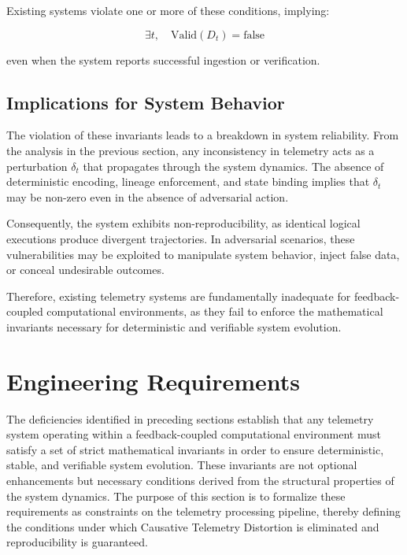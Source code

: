 Existing systems violate one or more of these conditions, implying:

\begin{equation}
\exists t, \quad \text{Valid}(D_t) = \text{false}
\end{equation}

even when the system reports successful ingestion or verification.

\subsection{Implications for System Behavior}

The violation of these invariants leads to a breakdown in system reliability. From the analysis in the previous section, any inconsistency in telemetry acts as a perturbation $\delta_t$ that propagates through the system dynamics. The absence of deterministic encoding, lineage enforcement, and state binding implies that $\delta_t$ may be non-zero even in the absence of adversarial action.

Consequently, the system exhibits non-reproducibility, as identical logical executions produce divergent trajectories. In adversarial scenarios, these vulnerabilities may be exploited to manipulate system behavior, inject false data, or conceal undesirable outcomes.

Therefore, existing telemetry systems are fundamentally inadequate for feedback-coupled computational environments, as they fail to enforce the mathematical invariants necessary for deterministic and verifiable system evolution.

\section{Engineering Requirements}

The deficiencies identified in preceding sections establish that any telemetry system operating within a feedback-coupled computational environment must satisfy a set of strict mathematical invariants in order to ensure deterministic, stable, and verifiable system evolution. These invariants are not optional enhancements but necessary conditions derived from the structural properties of the system dynamics. The purpose of this section is to formalize these requirements as constraints on the telemetry processing pipeline, thereby defining the conditions under which Causative Telemetry Distortion is eliminated and reproducibility is guaranteed.

